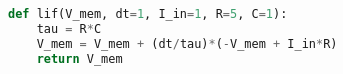 \begin{lstlisting}[language=Python, caption={Python implementation of the action potential decreasing of a LIF: $I_{in}=1$}, label={lst:membranepotentialincrease}]
	
def lif(V_mem, dt=1, I_in=1, R=5, C=1):
	tau = R*C
	V_mem = V_mem + (dt/tau)*(-V_mem + I_in*R)
	return V_mem
\end{lstlisting}